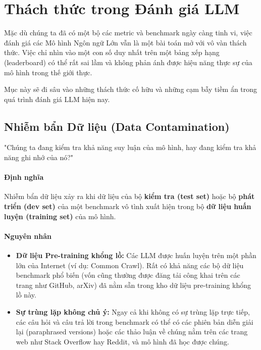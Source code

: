 
\section{Thách thức trong Đánh giá LLM}
\label{sec:llm_evaluation_challenges}

Mặc dù chúng ta đã có một bộ các metric và benchmark ngày càng tinh vi, việc đánh giá các Mô hình Ngôn ngữ Lớn vẫn là một bài toán mở với vô vàn thách thức. Việc chỉ nhìn vào một con số duy nhất trên một bảng xếp hạng (leaderboard) có thể rất sai lầm và không phản ánh được hiệu năng thực sự của mô hình trong thế giới thực.

Mục này sẽ đi sâu vào những thách thức cố hữu và những cạm bẫy tiềm ẩn trong quá trình đánh giá LLM hiện nay.

\subsection{Nhiễm bẩn Dữ liệu (Data Contamination)}
\label{ssec:data_contamination}

\begin{tcolorbox}[
    title=Vấn đề cốt lõi,
    colback=red!5!white, colframe=red!75!black, fonttitle=\bfseries
]
"Chúng ta đang kiểm tra khả năng suy luận của mô hình, hay đang kiểm tra khả năng ghi nhớ của nó?"
\end{tcolorbox}

\paragraph{Định nghĩa}
Nhiễm bẩn dữ liệu xảy ra khi dữ liệu của bộ \textbf{kiểm tra (test set)} hoặc bộ \textbf{phát triển (dev set)} của một benchmark vô tình xuất hiện trong bộ \textbf{dữ liệu huấn luyện (training set)} của mô hình.

\paragraph{Nguyên nhân}
\begin{itemize}
    \item \textbf{Dữ liệu Pre-training khổng lồ:} Các LLM được huấn luyện trên một phần lớn của Internet (ví dụ: Common Crawl). Rất có khả năng các bộ dữ liệu benchmark phổ biến (vốn cũng thường được đăng tải công khai trên các trang như GitHub, arXiv) đã nằm sẵn trong kho dữ liệu pre-training khổng lồ này.
    \item \textbf{Sự trùng lặp không chủ ý:} Ngay cả khi không có sự trùng lặp trực tiếp, các câu hỏi và câu trả lời trong benchmark có thể có các phiên bản diễn giải lại (paraphrased versions) hoặc các thảo luận về chúng nằm trên các trang web như Stack Overflow hay Reddit, và mô hình đã học được chúng.
\end{itemize}

